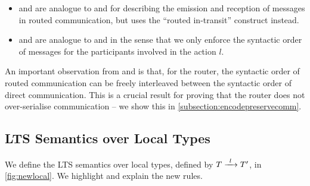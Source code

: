 \begin{figure}[!h]
\begin{prooftree}
\end{prooftree}

\label{fig:newglobal}
\end{figure}

\begin{itemize}

\item {} and 
are analogue to  and 
for describing the emission and reception of
messages in routed communication, but uses
the ``routed in-transit'' construct instead.

\item {} and 
are analogue to  and 
in the sense that we only enforce the
syntactic order of messages for the participants
involved in the action $l$.

\end{itemize}

An important observation from
 and  is that,
for the router,
the syntactic order of routed communication
can be freely interleaved between
the syntactic order of direct communication.
This is a crucial result for proving
that the router does not over-serialise
communication -- 
we show this in \cref{subsection:encodepreservecomm}.

\subsection{LTS Semantics over Local Types}
\label{subsection:newltslocal}

We define the LTS semantics 
over local types,
defined by $\treduce{T}{T'}{l}$,
in \cref{fig:newlocal}.
We highlight and explain the new rules.

